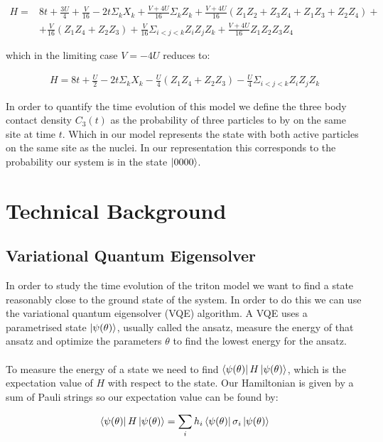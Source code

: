 \documentclass[10 pt, a4paper]{article}
\begin{document}
\begin{align}
\nonumber H =& 8t + \frac{3U}{4} + \frac{V}{16} -2t \Sigma_{k} X_k + \frac{V + 4U}{16} \Sigma_k Z_k + \frac{V + 4U}{16}(Z_1 Z_2 + Z_3 Z_4 + Z_1 Z_3 + Z_2 Z_4) + \\
&+ \frac{V}{16} (Z_1 Z_4 + Z_2 Z_3) + \frac{V}{16} \Sigma_{i<j<k} Z_i Z_j Z_k + \frac{V + 4U}{16} Z_1 Z_2 Z_3 Z_4 
\end{align}

which in the limiting case $V = -4U$ reduces to:

\begin{align} \label{eqn:hamlimit}
H = 8t + \frac{U}{2} -2t \Sigma_{k} X_k - \frac{U}{4} (Z_1 Z_4 + Z_2 Z_3) - \frac{U}{4} \Sigma_{i<j<k} Z_i Z_j Z_k
\end{align}

In order to quantify the time evolution of this model we define the three body contact density $C_3 (t)$ as the probability of three particles to by on the same site at time $t$. Which in our model represents the state with both active particles on the same site as the nuclei. In our representation this corresponds to the probability our system is in the state $\ket{0000}$.

\section{Technical Background}

\subsection{Variational Quantum Eigensolver} \label{sec:VQE}

In order to study the time evolution of the triton model we want to find a state reasonably close to the ground state of the system. In order to do this we can use the variational quantum eigensolver (VQE) algorithm. A VQE uses a parametrised state $\ket{\psi(\theta)}$, usually called the ansatz, measure the energy of that ansatz and optimize the parameters $\theta$ to find the lowest energy for the ansatz.
\\
\\
To measure the energy of a state we need to find $\bra{\psi(\theta)} H \ket{\psi(\theta)}$, which is the expectation value of $H$ with respect to the state. Our Hamiltonian is given by a sum of Pauli strings so our expectation value can be found by:

\begin{align*}
\bra{\psi(\theta)} H \ket{\psi(\theta)} = \sum_i h_i \bra{\psi(\theta)} \sigma_i \ket{\psi(\theta)}
\end{align*}
\end{document}

